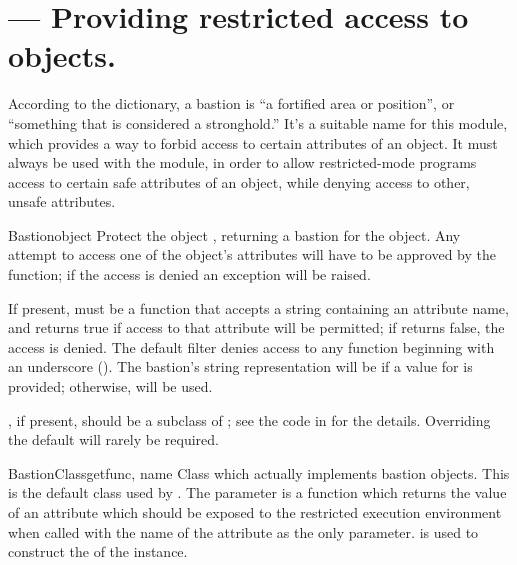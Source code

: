 \section{ ---
         Providing restricted access to objects.}




According to the dictionary, a bastion is ``a fortified area or
position'', or ``something that is considered a stronghold.''  It's a
suitable name for this module, which provides a way to forbid access
to certain attributes of an object.  It must always be used with the
 module, in order to allow restricted-mode programs access
to certain safe attributes of an object, while denying access to
other, unsafe attributes.


\begin{funcdesc}{Bastion}{object}
Protect the object , returning a bastion for the
object.  Any attempt to access one of the object's attributes will
have to be approved by the  function; if the access is
denied an  exception will be raised.

If present,  must be a function that accepts a string
containing an attribute name, and returns true if access to that
attribute will be permitted; if  returns false, the access
is denied.  The default filter denies access to any function beginning
with an underscore (\samp{_}).  The bastion's string representation
will be  if a value for
 is provided; otherwise,  will be
used.

, if present, should be a subclass of ; 
see the code in  for the details.  Overriding the
default  will rarely be required.
\end{funcdesc}


\begin{classdesc}{BastionClass}{getfunc, name}
Class which actually implements bastion objects.  This is the default
class used by .  The  parameter is a
function which returns the value of an attribute which should be
exposed to the restricted execution environment when called with the
name of the attribute as the only parameter.   is used to
construct the  of the  instance.
\end{classdesc}
